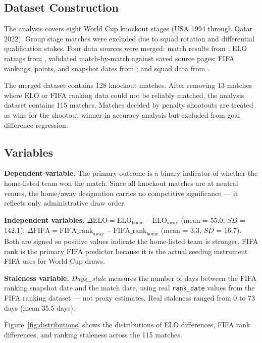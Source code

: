 \documentclass[12pt, a4paper]{article}
\begin{document}
\subsection{Dataset Construction}

The analysis covers eight World Cup knockout stages (USA 1994 through Qatar 2022). Group stage
matches were excluded due to squad rotation and differential qualification stakes. Four data
sources were merged: match results from ;
ELO ratings from , validated match-by-match against saved source pages;
FIFA rankings, points, and snapshot dates from ;
and squad data from .

The merged dataset contains 128 knockout matches. After removing 13 matches where ELO or FIFA
ranking data could not be reliably matched, the analysis dataset contains 115 matches.
Matches decided by penalty shootouts are treated as wins for the shootout winner in accuracy
analysis but excluded from goal difference regression.

\subsection{Variables}

\textbf{Dependent variable.} The primary outcome is a binary indicator of whether the
home-listed team won the match. Since all knockout matches are at neutral venues, the
home/away designation carries no competitive significance --- it reflects only administrative
draw order.

\textbf{Independent variables.} $\Delta\text{ELO} = \text{ELO}_{\text{home}} -
\text{ELO}_{\text{away}}$ (mean = 55.0, $SD$ = 142.1); $\Delta\text{FIFA} =
\text{FIFA\_rank}_{\text{away}} - \text{FIFA\_rank}_{\text{home}}$ (mean = 3.3, $SD$ = 16.7).
Both are signed so positive values indicate the home-listed team is stronger. FIFA rank is the
primary FIFA predictor because it is the actual seeding instrument FIFA uses for World Cup draws.

\textbf{Staleness variable.} \textit{Days\_stale} measures the number of days between the FIFA
ranking snapshot date and the match date, using real \texttt{rank\_date} values from the FIFA
ranking dataset \cite{alex2024fifaranking} --- not proxy estimates. Real staleness ranged from 0 to 73 days (mean 35.5 days).

Figure~\ref{fig:distributions} shows the distributions of ELO differences, FIFA rank
differences, and ranking staleness across the 115 matches.
\end{document}
